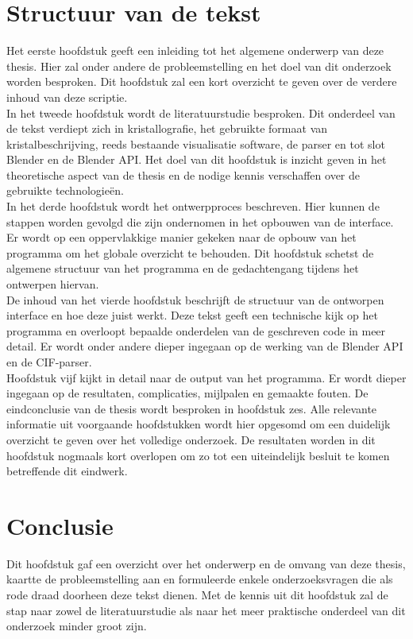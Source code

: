 \section{Structuur van de tekst}
Het eerste hoofdstuk geeft een inleiding tot het algemene onderwerp van deze thesis. Hier zal onder andere de probleemstelling en het doel van dit onderzoek worden besproken. Dit hoofdstuk zal een kort overzicht te geven over de verdere inhoud van deze scriptie.  
\\
In het tweede hoofdstuk wordt de literatuurstudie besproken. Dit onderdeel van de tekst verdiept zich in kristallografie, het gebruikte formaat van kristalbeschrijving, reeds bestaande visualisatie software, de parser en tot slot Blender en de Blender API. Het doel van dit hoofdstuk is inzicht geven in het theoretische aspect van de thesis en de nodige kennis verschaffen over de gebruikte technologieën.
\\
In het derde hoofdstuk wordt het ontwerpproces beschreven. Hier kunnen de stappen worden gevolgd die zijn ondernomen in het opbouwen van de interface. Er wordt op een oppervlakkige manier gekeken naar de opbouw van het programma om het globale overzicht te behouden. Dit hoofdstuk schetst de algemene structuur van het programma en de gedachtengang tijdens het ontwerpen hiervan.
\\
De inhoud van het vierde hoofdstuk beschrijft de structuur van de ontworpen interface en hoe deze juist werkt. Deze tekst geeft een technische kijk op het programma en overloopt bepaalde onderdelen van de geschreven code in meer detail. Er wordt onder andere dieper ingegaan op de werking van de Blender API en de CIF-parser.
\\
Hoofdstuk vijf kijkt in detail naar de output van het programma. Er wordt dieper ingegaan op de resultaten, complicaties, mijlpalen en gemaakte fouten. 
De eindconclusie van de thesis wordt besproken in hoofdstuk zes. Alle relevante informatie uit voorgaande hoofdstukken wordt hier opgesomd om een duidelijk overzicht te geven over het volledige onderzoek. De resultaten worden in dit hoofdstuk nogmaals kort overlopen om zo tot een uiteindelijk besluit te komen betreffende dit eindwerk.
\\


\section{Conclusie}
Dit hoofdstuk gaf een overzicht over het onderwerp en de omvang van deze thesis, kaartte de probleemstelling aan en formuleerde enkele onderzoeksvragen die als rode draad doorheen deze tekst dienen. Met de kennis uit dit hoofdstuk zal de stap naar zowel de literatuurstudie als naar het meer praktische onderdeel van dit onderzoek minder groot zijn.

